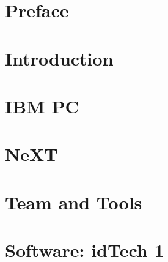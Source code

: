 \documentclass{book}
\begin{document}
    \tableofcontents
    
    \pagebreak

     \chapter*{Preface}
       
    

    \chapter{Introduction}
      

   
      \chapter{IBM PC}
        
        
        
        
        
        
            

        


        
     \chapter{NeXT}
          


    

    \chapter{Team and Tools}
       
       
       
      
      
      
      
      




     \chapter{Software: idTech 1}
      
      
      
      
       
       
       
       
       
       
       
       
          
        
      
\end{document}
